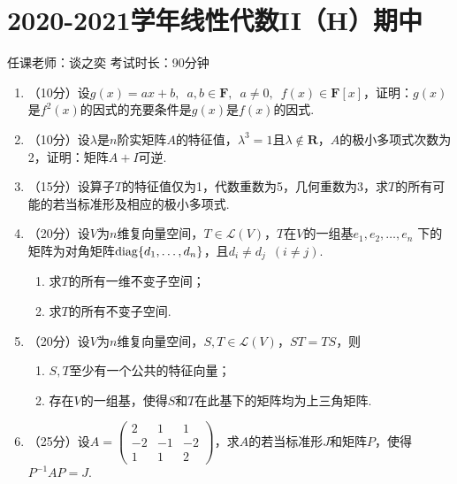 \section{2020-2021学年线性代数II（H）期中}

\begin{center}
    任课老师：谈之奕\hspace{4em} 考试时长：90分钟
\end{center}

\begin{enumerate}
    \item （10分）设$g(x)=ax+b,\enspace a,b\in\mathbf{F},\enspace a\neq 0,\enspace
    f(x)\in \mathbf{F}[x]$，证明：$g(x)$是$f^2(x)$的因式的充要条件是$g(x)$是$f(x)$的因式.
	\item （10分）设$\lambda$是$n$阶实矩阵$A$的特征值，$\lambda^3=1$且$\lambda\notin\mathbf{R}$，$A$的极小多项式次数为2，证明：矩阵$A+I$可逆.
	\item （15分）设算子$T$的特征值仅为1，代数重数为5，几何重数为3，求$T$的所有可能的若当标准形及相应的极小多项式.
	\item （20分）设$V$为$n$维复向量空间，$T\in \mathcal{L}(V)$，$T$在$V$的一组基$e_1,e_2,\ldots,e_n$
	下的矩阵为对角矩阵$\operatorname{diag}\{d_1,\ldots,d_n\}$，且$d_i\neq d_j\enspace(i\neq j)$.
    \begin{enumerate}
        \item 求$T$的所有一维不变子空间；

        \item 求$T$的所有不变子空间.
    \end{enumerate}
	\item （20分）设$V$为$n$维复向量空间，$S,T\in \mathcal{L}(V)$，$ST=TS$，则
    \begin{enumerate}
        \item $S,T$至少有一个公共的特征向量；

        \item 存在$V$的一组基，使得$S$和$T$在此基下的矩阵均为上三角矩阵.
    \end{enumerate}
	\item （25分）设$A=\begin{pmatrix}
		2 & 1 & 1 \\ -2 & -1 & -2 \\ 1 & 1 & 2
	\end{pmatrix}$，求$A$的若当标准形$J$和矩阵$P$，使得$P^{-1}AP=J$.
\end{enumerate}

\clearpage
